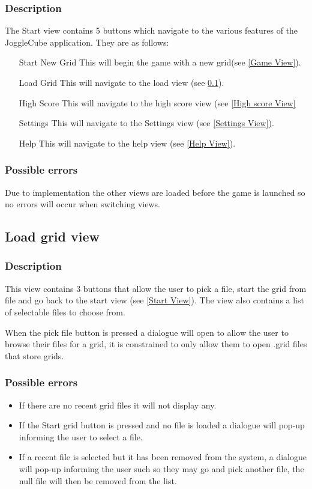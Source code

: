 \documentclass{project}
\begin{document}
\subsubsection{Description}
The Start view contains 5 buttons which navigate to the various features of the JoggleCube application. They are as follows:
\begin{itemize}
\item[Start New Grid] This will begin the game with a new grid(see \ref{Game View}).
\item[Load Grid] This will navigate to the load view (see \ref{Load View}).
\item[High Score] This will navigate to the high score view (see \ref{High score View}
\item[Settings] This will navigate to the Settings view (see \ref{Settings View}).
\item[Help] This will navigate to the help view (see \ref{Help View}).
\end{itemize} 
\subsubsection{Possible errors}
Due to implementation the other views are loaded before the game is launched so no errors will occur when switching views.

\subsection{Load grid view} \label{Load View}
\subsubsection{Description}
This view contains 3 buttons that allow the user to pick a file, start the grid from file and go back to the start view (see \ref{Start View}). The view also contains a list of selectable files to choose from.

When the pick file button is pressed a dialogue will open to allow the user to browse their files for a grid, it is constrained to only allow them to open .grid files that store grids.
\subsubsection{Possible errors}
\begin{itemize}
\item If there are no recent grid files it will not display any.
\item If the Start grid button is pressed and no file is loaded a dialogue will pop-up informing the user to select a file.
\item If a recent file is selected but it has been removed from the system, a dialogue will pop-up informing the user such so they may go and pick another file, the null file will then be removed from the list.
\end{itemize}
\end{document}
